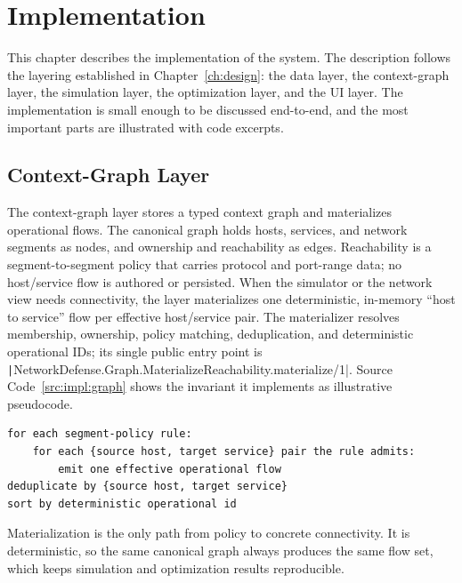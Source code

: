 \chapter{Implementation}
\label{ch:implementation}

This chapter describes the implementation of the system. The description follows the layering established in Chapter~\ref{ch:design}: the data layer, the context-graph layer, the simulation layer, the optimization layer, and the UI layer. The implementation is small enough to be discussed end-to-end, and the most important parts are illustrated with code excerpts.

\section{Context-Graph Layer}

The context-graph layer stores a typed context graph and materializes operational flows. The canonical graph holds hosts, services, and network segments as nodes, and ownership and reachability as edges. Reachability is a segment-to-segment policy that carries protocol and port-range data; no host/service flow is authored or persisted. When the simulator or the network view needs connectivity, the layer materializes one deterministic, in-memory \enquote{host to service} flow per effective host/service pair. The materializer resolves membership, ownership, policy matching, deduplication, and deterministic operational IDs; its single public entry point is \texttt|NetworkDefense.Graph.MaterializeReachability.materialize/1|. Source Code~\ref{src:impl:graph} shows the invariant it implements as illustrative pseudocode.

\begin{code}
	\begin{verbatim}
for each segment-policy rule:
    for each {source host, target service} pair the rule admits:
        emit one effective operational flow
deduplicate by {source host, target service}
sort by deterministic operational id
	\end{verbatim}
	\caption{Illustrative pseudocode: materializing operational flows from segment policy.}
	\label{src:impl:graph}
\end{code}

Materialization is the only path from policy to concrete connectivity. It is deterministic, so the same canonical graph always produces the same flow set, which keeps simulation and optimization results reproducible.

